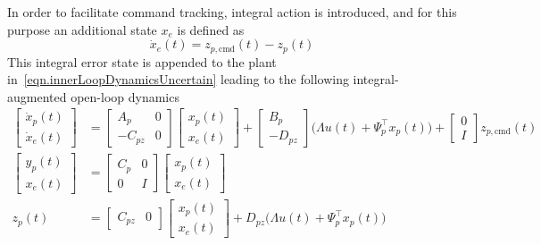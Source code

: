 In order to facilitate command tracking, integral action is introduced, and for this purpose an additional state $x_e$ is defined as
\begin{equation}
  \label{eqn.xedot}
  \dot{x}_{e}(t) = z_{p,\text{cmd}}(t) - z_{p}(t)
\end{equation}
This integral error state is appended to the plant in\ \eqref{eqn.innerLoopDynamicsUncertain} leading to the following integral-augmented open-loop dynamics
\begin{equation}
  \label{eqn.uncsystemfull}
  \begin{split}
    \begin{bmatrix}
      \dot{x}_{p}(t) \\
      \dot{x}_{e}(t)
    \end{bmatrix}
    &=
    \begin{bmatrix}
      A_{p} & 0 \\
      -C_{pz} & 0
    \end{bmatrix}
    \begin{bmatrix}
      x_{p}(t) \\
      x_{e}(t)
    \end{bmatrix}
    +
    \begin{bmatrix}
      B_{p} \\
      -D_{pz}
    \end{bmatrix}\bigr(\Lambda u(t)+\Psi_{p}^{\top}x_{p}(t)\bigr)
    +
    \begin{bmatrix}
      0 \\
      I
    \end{bmatrix}z_{p,\text{cmd}}(t) \\
    \begin{bmatrix}
      y_{p}(t) \\
      x_{e}(t)
    \end{bmatrix}
    &=
    \begin{bmatrix}
      C_{p} & 0 \\
      0 & I
    \end{bmatrix}
    \begin{bmatrix}
      x_{p}(t) \\
      x_{e}(t)
    \end{bmatrix} \\
    z_{p}(t)
    &=
    \begin{bmatrix}
      C_{pz} & 0
    \end{bmatrix}
    \begin{bmatrix}
      x_{p}(t) \\
      x_{e}(t)
    \end{bmatrix}
    +
    D_{pz}\bigr(\Lambda u(t) + \Psi_{p}^{\top}x_{p}(t)\bigr)
  \end{split}
\end{equation}
